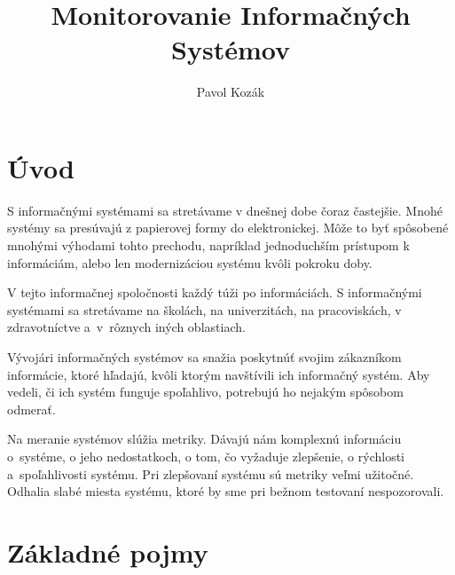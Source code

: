 \documentclass[a4paper, upjsfrontpage, disablespecwarning, thesismargins, thesislinespacing]{rnthesis}
\title{Monitorovanie Informačných Systémov}
\author{Pavol Kozák}
\begin{document}
\maketitle
\newpage

\setcounter{tocdepth}{2}
\tableofcontents

\newpage


\chapter*{Úvod}

S informačnými systémami sa stretávame v dnešnej dobe čoraz častejšie. 
Mnohé systémy sa presúvajú z papierovej formy do elektronickej.
Môže to byť spôsobené mnohými výhodami tohto prechodu, napríklad jednoduchším prístupom k informáciám, alebo len modernizáciou systému kvôli pokroku doby.

V tejto informačnej spoločnosti každý túži po informáciách.
S informačnými systémami sa stretávame na školách, na univerzitách, na pracoviskách, v zdravot\-níc\-tve a~v~rôznych iných oblastiach.

Vývojári informačných systémov sa snažia poskytnúť svojim zákazníkom informácie, ktoré hľadajú, kvôli ktorým navštívili ich informačný systém.
Aby vedeli, či ich systém funguje spoľahlivo, potrebujú ho nejakým spôsobom odmerať.

Na meranie systémov slúžia metriky.
Dávajú nám komplexnú informáciu o~systéme, o jeho nedostatkoch, o tom, čo vyžaduje zlepšenie, o rýchlosti a~spoľahli\-vos\-ti systému.
Pri zlepšovaní systému sú metriky veľmi užitočné.
Odhalia slabé miesta systému, ktoré by sme pri bežnom testovaní nespozorovali.


\chapter{Základné pojmy}

\end{document}
